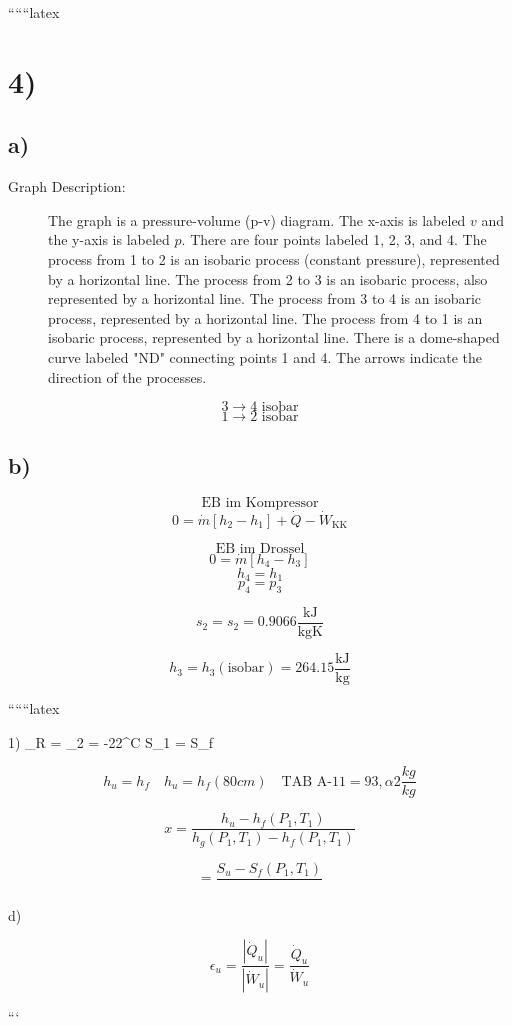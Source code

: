 
``````latex


\section*{4)}

\subsection*{a)}

\begin{description}
    \item[Graph Description:] The graph is a pressure-volume (p-v) diagram. The x-axis is labeled \( v \) and the y-axis is labeled \( p \). There are four points labeled 1, 2, 3, and 4. The process from 1 to 2 is an isobaric process (constant pressure), represented by a horizontal line. The process from 2 to 3 is an isobaric process, also represented by a horizontal line. The process from 3 to 4 is an isobaric process, represented by a horizontal line. The process from 4 to 1 is an isobaric process, represented by a horizontal line. There is a dome-shaped curve labeled "ND" connecting points 1 and 4. The arrows indicate the direction of the processes.
\end{description}

\[
3 \rightarrow 4 \text{ isobar}
\]
\[
1 \rightarrow 2 \text{ isobar}
\]

\subsection*{b)}

\[
\text{EB im Kompressor}
\]
\[
0 = \dot{m} \left[ h_2 - h_1 \right] + \dot{Q} - \dot{W}_{\text{KK}}
\]

\[
\text{EB im Drossel}
\]
\[
0 = \dot{m} \left[ h_4 - h_3 \right]
\]
\[
h_{4} = h_{1}
\]
\[
p_{4} = p_{3}
\]

\[
s_2 = s_2 = 0.9066 \frac{\text{kJ}}{\text{kgK}}
\]

\[
h_3 = h_3 \left( \text{isobar} \right) = 264.15 \frac{\text{kJ}}{\text{kg}}
\]

``````latex

1) \quad {}_R =  \quad \tau_2 = -22^\circ C \quad S_1 = S_f

\[
h_u = h_f \quad h_{u} = h_f \left(80 cm\right) \quad \text{TAB A-11} = 93, \alpha 2 \frac{kg}{kg}
\]

\[
x = \frac{h_u - h_f \left(P_1, T_1\right)}{h_g \left(P_1, T_1\right) - h_f \left(P_1, T_1\right)}
\]

\[
= \frac{S_u - S_f \left(P_1, T_1\right)}{}
\]

d)

\[
\epsilon_u = \frac{\left| \dot{Q}_u \right|}{\left| \dot{W}_u \right|} = \frac{\dot{Q}_u}{\dot{W}_u}
\]

```